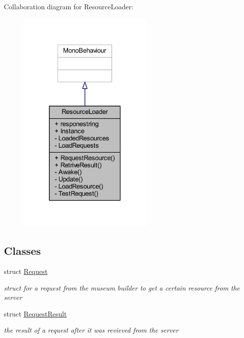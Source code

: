 Collaboration diagram for Resource\+Loader\+:
\nopagebreak
\begin{figure}[H]
\begin{center}
\leavevmode
\includegraphics[width=189pt]{class_resource_loader__coll__graph}
\end{center}
\end{figure}
\subsection*{Classes}
\begin{DoxyCompactItemize}
\item 
struct \mbox{\hyperlink{struct_resource_loader_1_1_request}{Request}}
\begin{DoxyCompactList}\small\item\em struct for a request from the museum builder to get a certain resource from the server \end{DoxyCompactList}\item 
struct \mbox{\hyperlink{struct_resource_loader_1_1_request_result}{Request\+Result}}
\begin{DoxyCompactList}\small\item\em the result of a request after it was revieved from the server \end{DoxyCompactList}\end{DoxyCompactItemize}
